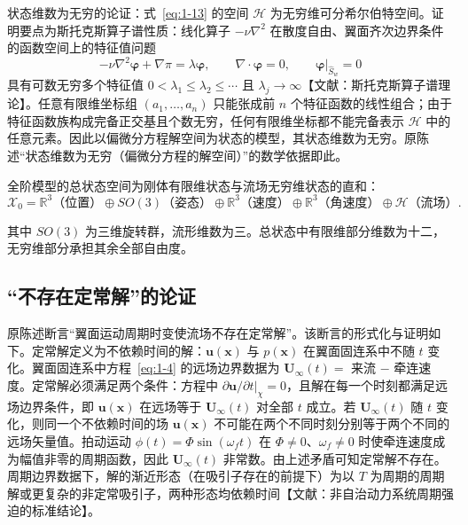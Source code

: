 \documentclass[11pt,a4paper]{ctexart}
\numberwithin{equation}{section}
\newcommand{\R}{\mathbb{R}}
\begin{document}
状态维数为无穷的论证：式~\eqref{eq:1-13} 的空间 $\mathcal{H}$ 为无穷维可分希尔伯特空间。证明要点为斯托克斯算子谱性质：线化算子 $-\nu\nabla^2$ 在散度自由、翼面齐次边界条件的函数空间上的特征值问题
\begin{equation}
  -\nu\nabla^2\bm{\varphi} + \nabla\pi = \lambda\bm{\varphi}, \qquad
  \nabla\cdot\bm{\varphi} = 0, \qquad
  \bm{\varphi}\big|_{\hat{S}_w} = 0 \label{eq:1-14}
\end{equation}
具有可数无穷多个特征值 $0 < \lambda_1 \le \lambda_2 \le \cdots$ 且 $\lambda_j \to \infty$【文献：斯托克斯算子谱理论】。任意有限维坐标组 $(a_1, \ldots, a_n)$ 只能张成前 $n$ 个特征函数的线性组合；由于特征函数族构成完备正交基且个数无穷，任何有限维坐标都不能完备表示 $\mathcal{H}$ 中的任意元素。因此以偏微分方程解空间为状态的模型，其状态维数为无穷。原陈述“状态维数为无穷（偏微分方程的解空间）”的数学依据即此。

全阶模型的总状态空间为刚体有限维状态与流场无穷维状态的直和：
\begin{equation}
  \mathcal{X}_0
  = \R^3\text{（位置）} \oplus SO(3)\text{（姿态）} \oplus \R^3\text{（速度）} \oplus \R^3\text{（角速度）} \oplus \mathcal{H}\text{（流场）}. \label{eq:1-15}
\end{equation}

其中 $SO(3)$ 为三维旋转群，流形维数为三。总状态中有限维部分维数为十二，无穷维部分承担其余全部自由度。

\subsection{“不存在定常解”的论证}

原陈述断言“翼面运动周期时变使流场不存在定常解”。该断言的形式化与证明如下。定常解定义为不依赖时间的解：$\bm{u}(\bm{x})$ 与 $p(\bm{x})$ 在翼面固连系中不随 $t$ 变化。翼面固连系中方程~\eqref{eq:1-4} 的远场边界数据为 $\bm{U}_\infty(t) = $ 来流 $-$ 牵连速度。定常解必须满足两个条件：方程中 $\partial\bm{u}/\partial t|_\chi = 0$，且解在每一个时刻都满足远场边界条件，即 $\bm{u}(\bm{x})$ 在远场等于 $\bm{U}_\infty(t)$ 对全部 $t$ 成立。若 $\bm{U}_\infty(t)$ 随 $t$ 变化，则同一个不依赖时间的场 $\bm{u}(\bm{x})$ 不可能在两个不同时刻分别等于两个不同的远场矢量值。拍动运动 $\phi(t) = \Phi\sin(\omega_f t)$ 在 $\Phi \ne 0$、$\omega_f \ne 0$ 时使牵连速度成为幅值非零的周期函数，因此 $\bm{U}_\infty(t)$ 非常数。由上述矛盾可知定常解不存在。周期边界数据下，解的渐近形态（在吸引子存在的前提下）为以 $T$ 为周期的周期解或更复杂的非定常吸引子，两种形态均依赖时间【文献：非自治动力系统周期强迫的标准结论】。
\end{document}
